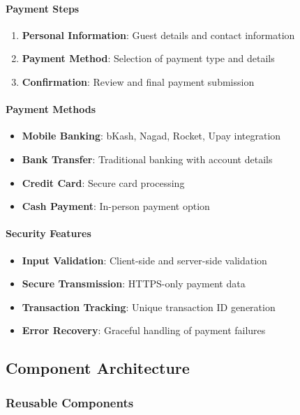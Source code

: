 \documentclass[12pt,a4paper]{article}
\begin{document}
\paragraph{Payment Steps}
\begin{enumerate}
\item \textbf{Personal Information}: Guest details and contact information
\item \textbf{Payment Method}: Selection of payment type and details
\item \textbf{Confirmation}: Review and final payment submission
\end{enumerate}

\paragraph{Payment Methods}
\begin{itemize}
\item \textbf{Mobile Banking}: bKash, Nagad, Rocket, Upay integration
\item \textbf{Bank Transfer}: Traditional banking with account details
\item \textbf{Credit Card}: Secure card processing
\item \textbf{Cash Payment}: In-person payment option
\end{itemize}

\paragraph{Security Features}
\begin{itemize}
\item \textbf{Input Validation}: Client-side and server-side validation
\item \textbf{Secure Transmission}: HTTPS-only payment data
\item \textbf{Transaction Tracking}: Unique transaction ID generation
\item \textbf{Error Recovery}: Graceful handling of payment failures
\end{itemize}

\subsection{Component Architecture}
\label{subsec:component-architecture}

\subsubsection{Reusable Components}
\label{subsubsec:reusable-components}
\end{document}
